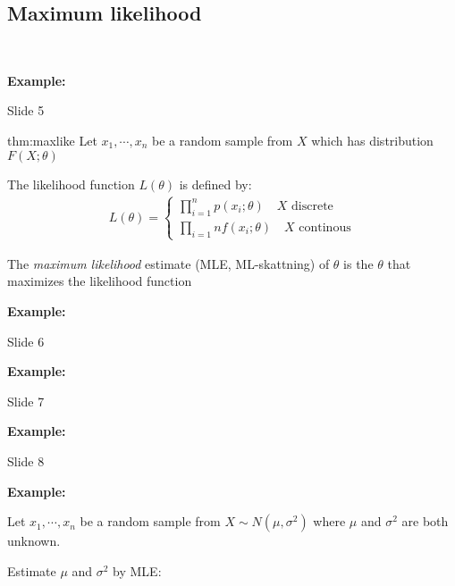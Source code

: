 \subsection{Maximum likelihood}\hfill\\\par
\noindent\textbf{Example:}\par
Slide 5
\par\bigskip
\begin{theo}{thm:maxlike}
  Let $x_1,\cdots,x_n$ be a random sample from $X$ which has distribution $F(X;\theta)$
  \par\bigskip
  \noindent The likelihood function $L(\theta)$ is defined by:
  \begin{equation*}
    \begin{gathered}
      L(\theta) = \begin{cases}\prod_{i=1}^{n}p(x_i;\theta)\quad X\text{ discrete}\\
      \prod_{i=1}{n}f(x_i;\theta)\quad X\text{ continous}\end{cases}
    \end{gathered}
  \end{equation*}
  \par\bigskip
  \noindent The \textit{maximum likelihood} estimate (MLE, ML-skattning) of $\theta$ is the $\theta$ that maximizes the likelihood function
  \par\bigskip
\end{theo}
\par\bigskip
\noindent\textbf{Example:}\par
Slide 6
\par\bigskip
\noindent\textbf{Example:}\par
Slide 7
\par\bigskip
\noindent\textbf{Example:}\par
Slide 8
\par\bigskip
\noindent\textbf{Example:}\par
\noindent Let $x_1,\cdots,x_n$ be a random sample from $X\sim N(\mu,\sigma^2)$ where $\mu$ and $\sigma^2$ are both unknown.
\par\bigskip
\noindent Estimate $\mu$ and $\sigma^2$ by MLE:
